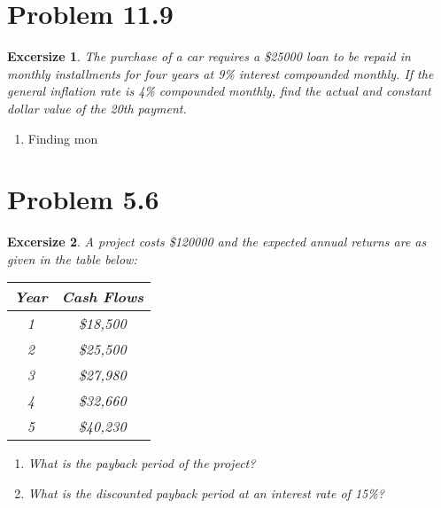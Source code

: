 \documentclass[../INDE250HW.tex]{subfiles}
\newtheorem{exrc}{Excersize}
\begin{document}
\section*{Problem 11.9}
\begin{exrc}
    The purchase of a car requires a \$25000 loan to be repaid in monthly installments for four years at 9\% interest compounded monthly. If the general inflation rate is 4\% compounded monthly, find the actual and constant dollar value of the 20th payment.
\end{exrc}
\begin{enumerate}
    \item Finding mon
\end{enumerate}



\section*{Problem 5.6}
\begin{exrc}
    A project costs \$120000 and the expected annual returns are as given in the table below:
    \begin{center}
        \begin{tabular}{ c c }
            Year & Cash Flows \\
            \hline
            1   &   \$18,500 \\
            2   &   \$25,500 \\
            3   &   \$27,980 \\
            4   &   \$32,660 \\
            5   &   \$40,230
        \end{tabular}
    \end{center}
    \begin{enumerate}
        \item What is the payback period of the project?
        \item What is the discounted payback period at an interest rate of 15\%?
    \end{enumerate}
\end{exrc}
\end{document}
